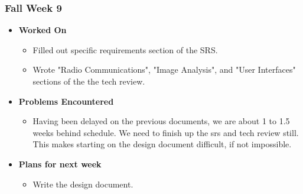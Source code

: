 \documentclass{article}
\begin{document}
\subsubsection{Fall Week 9}
\begin{itemize}
    \item {\textbf{Worked On}}
    \begin{itemize}
        \item Filled out specific requirements section of the SRS.
        \item Wrote "Radio Communications", "Image Analysis", and "User Interfaces" sections of the the tech review.
    \end{itemize}

    \item {\textbf{Problems Encountered}}
    \begin{itemize}
        \item Having been delayed on the previous documents, we are about 1 to 1.5 weeks behind schedule. We need to finish up the srs and tech review still. This makes starting on the design document difficult, if not impossible.
    \end{itemize}

    \item{\textbf{Plans for next week}}
    \begin{itemize}
        \item Write the design document.
    \end{itemize}

\end{itemize}
\end{document}
